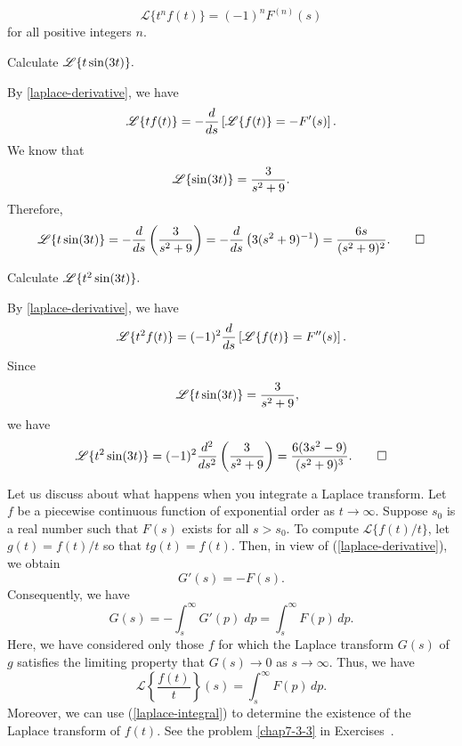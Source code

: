 \begin{equation}\label{laplace-derivative}
\boxed{
\mathscr{L}\{t^nf(t)\} =(-1)^nF^{(n)}(s)}
\end{equation}
 for all positive integers $n$.

\begin{example}
Calculate $\mathscr{L}\{t \sin(3t)\}.$
\end{example}

\begin{solution}

By \ref{laplace-derivative}, we have
 \[
 \mathscr{L}\{t f(t)\} = -\frac{d}{ds} \left[ \mathscr{L}\{f(t)\}  = -F'(s)\right].
 \]
We know that  
 \[
 \mathscr{L}\{\sin(3t)\} = \frac{3}{s^2 + 9}.
 \]
 Therefore,
 \[
 \mathscr{L}\{t \sin(3t)\} = -\frac{d}{ds} \left( \frac{3}{s^2 + 9} \right)
 = -\frac{d}{ds} \left( 3(s^2 + 9)^{-1} \right)
 = \frac{6s}{(s^2 + 9)^2}.\qedhere
 \]
\end{solution}

\begin{example}
	Calculate $\mathscr{L}\{t^2 \sin(3t)\}.$
\end{example}

\begin{solution}
By \ref{laplace-derivative}, we have
\[
\mathscr{L}\{t^2 f(t)\} = (-1)^2\frac{d}{ds} \left[ \mathscr{L}\{f(t)\}  = F''(s)\right].
\]
Since
\[
\quad \mathscr{L}\{t\sin(3t)\} = \frac{3}{s^2 + 9},
\]
we have
\[
\mathscr{L}\{t^2 \sin(3t)\} 
=(-1)^2 \frac{d^2}{ds^2} \left( \frac{3}{s^2 + 9}\right) = \frac{6(3s^2-9)}{(s^2 + 9)^3}.\qedhere
\]
\end{solution}

Let us discuss about what happens when you integrate a Laplace transform. Let $f$ be a piecewise continuous function of exponential order as $t\to\infty$. Suppose $s_0$ is a real number such that $F(s)$ exists for all $s>s_0.$ To compute $\mathscr{L}\{f(t)/t\}$, let 
$g(t) = f(t)/t$ so that $t g(t) =f(t).$  Then, in view of (\ref{laplace-derivative}), we obtain
\[ G'(s) = -F(s).\]
Consequently, we have
\[G(s) = -\int_s^{\infty}  G'(p)\; dp = \int_s^\infty F(p)\, dp.\]
Here, we have considered only those $f$ for which the Laplace transform $G(s)$  of $g$ satisfies the limiting property that $G(s) \to 0$ as $s\to \infty.$
Thus, we have
\begin{equation}\label{laplace-integral}
	\boxed{\mathscr{L}\left\{\frac{f(t)}{t}\right\}(s) =	\int_s^\infty F(p)\, dp.} 
\end{equation}
Moreover, we can use (\ref{laplace-integral}) to determine the existence of the Laplace transform of  $f(t).$  See the problem  \ref{chap7-3-3} in Exercises~\thesection.

